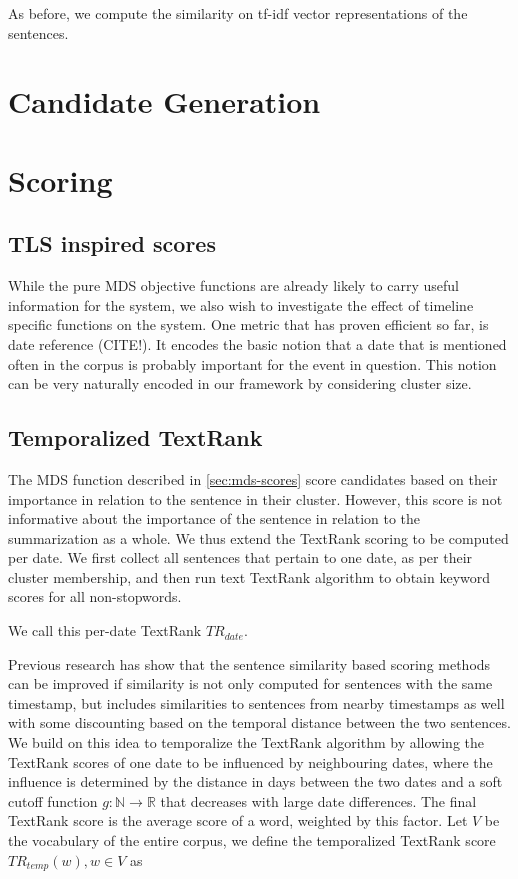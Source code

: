\documentclass[a4paper,BCOR=10mm]{report}
\begin{document}
As before, we compute the similarity on tf-idf vector representations of the sentences.

\section{Candidate Generation}

\section{Scoring} \label{sec:scoring}

\subsection{TLS inspired scores} \label{sec:tls-scores}

While the pure MDS objective functions are already likely to carry useful information for the system, we also wish to investigate the effect of timeline specific functions on the system.
One metric that has proven efficient so far, is date reference (CITE!). It encodes the basic notion that a date that is mentioned often in the corpus is probably important for the event in question.
This notion can be very naturally encoded in our framework by considering cluster size. %

\subsection{Temporalized TextRank}

The MDS function described in \ref{sec:mds-scores} score candidates based on their importance in relation to the sentence in their cluster. However, this score is not informative about the importance of the sentence in relation to the summarization as a whole.
We thus extend the TextRank scoring to be computed per date. We first collect all sentences that pertain to one date, as per their cluster membership, and then run text TextRank algorithm to obtain keyword scores for all non-stopwords.

We call this per-date TextRank $TR_{date}$.

Previous research \citet{yan, markert} has show that the sentence similarity based scoring methods can be improved if similarity is not only computed for sentences with the same timestamp, but includes similarities to sentences from nearby timestamps as well with some discounting based on the temporal distance between the two sentences.
We build on this idea to temporalize the TextRank algorithm by allowing the TextRank scores of one date to be influenced by neighbouring dates, where the influence is determined by the distance in days between the two dates and a soft cutoff function $g: \mathbb{N} \rightarrow \mathbb{R}$ that decreases with large date differences.
The final TextRank score is the average score of a word, weighted by this factor.
Let $V$ be the vocabulary of the entire corpus, we define the temporalized TextRank score $TR_{temp}(w), w \in V$ as
\end{document}
